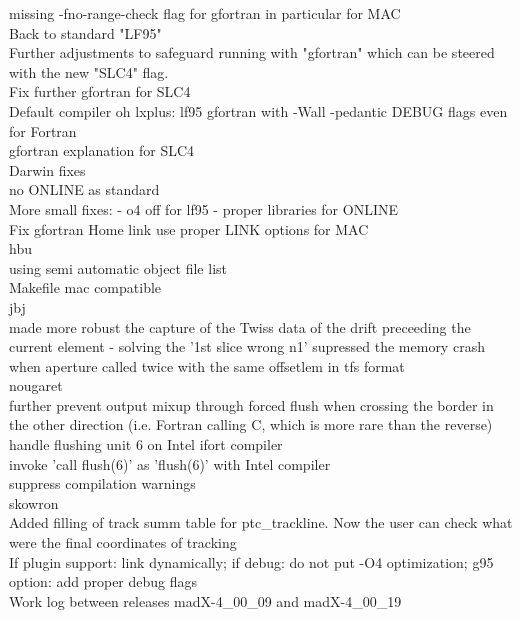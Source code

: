 missing  -fno-range-check flag for gfortran in particular for MAC  \\ 
Back to standard "LF95"  \\ 
Further adjustments to safeguard running with "gfortran" which can be steered with the new "SLC4" flag.  \\ 
Fix further gfortran for SLC4  \\ 
Default compiler oh lxplus: lf95 gfortran with -Wall -pedantic DEBUG flags even for Fortran  \\ 
gfortran explanation for SLC4  \\ 
Darwin fixes  \\ 
no ONLINE as standard  \\ 
More small fixes: - o4 off for lf95 - proper libraries for ONLINE  \\ 
Fix gfortran Home link use proper LINK options for MAC  \\ 
hbu \\ 
using semi automatic object file list  \\ 
Makefile mac compatible  \\ 
jbj \\ 
made more robust the capture of the Twiss data of the drift preceeding the current element - solving the '1st slice wrong n1'  supressed the memory crash when aperture called twice with the same offsetlem in tfs format  \\ 
nougaret \\ 
further prevent output mixup through forced flush when crossing the border in the other direction (i.e. Fortran calling C, which is more rare than the reverse)  \\ 
handle flushing unit 6 on Intel ifort compiler  \\ 
invoke 'call flush(6)' as 'flush(6)' with Intel compiler  \\ 
suppress compilation warnings  \\ 
skowron \\ 
Added filling of track summ table for ptc\_trackline. Now the user can check what were the final coordinates of tracking  \\ 
If plugin support: link dynamically; if debug: do not put -O4 optimization; g95 option: add proper debug flags 
\\

Work log between releases madX-4\_00\_09 and madX-4\_00\_19 

